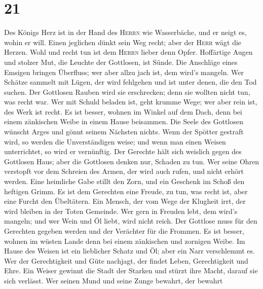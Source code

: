 \hypertarget{section-20}{%
\section{21}\label{section-20}}

 Des Königs Herz ist in der Hand des \textsc{Herrn} wie
Wasserbäche, und er neigt es, wohin er will.  Einen
jeglichen dünkt sein Weg recht; aber der \textsc{Herr} wägt die Herzen.
 Wohl und recht tun ist dem \textsc{Herrn} lieber denn
Opfer.  Hoffärtige Augen und stolzer Mut, die Leuchte der
Gottlosen, ist Sünde.  Die Anschläge eines Emsigen bringen
Überfluss; wer aber allzu jach ist, dem wird's mangeln. 
Wer Schätze sammelt mit Lügen, der wird fehlgehen und ist unter denen,
die den Tod suchen.  Der Gottlosen Rauben wird sie
erschrecken; denn sie wollten nicht tun, was recht war. 
Wer mit Schuld beladen ist, geht krumme Wege; wer aber rein ist, des
Werk ist recht.  Es ist besser, wohnen im Winkel auf dem
Dach, denn bei einem zänkischen Weibe in einem Hause beisammen.
 Die Seele des Gottlosen wünscht Arges und gönnt seinem
Nächsten nichts.  Wenn der Spötter gestraft wird, so
werden die Unverständigen weise; und wenn man einen Weisen unterrichtet,
so wird er vernünftig.  Der Gerechte hält sich weislich
gegen des Gottlosen Haus; aber die Gottlosen denken nur, Schaden zu tun.
 Wer seine Ohren verstopft vor dem Schreien des Armen,
der wird auch rufen, und nicht erhört werden.  Eine
heimliche Gabe stillt den Zorn, und ein Geschenk im Schoß den heftigen
Grimm.  Es ist dem Gerechten eine Freude, zu tun, was
recht ist, aber eine Furcht den Übeltätern.  Ein Mensch,
der vom Wege der Klugheit irrt, der wird bleiben in der Toten Gemeinde.
 Wer gern in Freuden lebt, dem wird's mangeln; und wer
Wein und Öl liebt, wird nicht reich.  Der Gottlose muss
für den Gerechten gegeben werden und der Verächter für die Frommen.
 Es ist besser, wohnen im wüsten Lande denn bei einem
zänkischen und zornigen Weibe.  Im Hause des Weisen ist
ein lieblicher Schatz und Öl; aber ein Narr verschlemmt es.
 Wer der Gerechtigkeit und Güte nachjagt, der findet
Leben, Gerechtigkeit und Ehre.  Ein Weiser gewinnt die
Stadt der Starken und stürzt ihre Macht, darauf sie sich verlässt.
 Wer seinen Mund und seine Zunge bewahrt, der bewahrt
